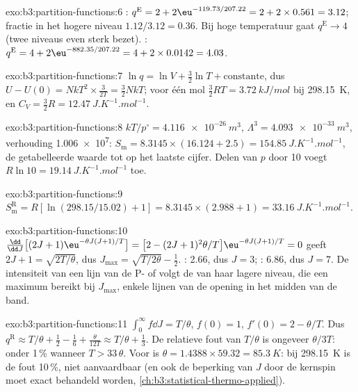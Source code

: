 \begin{solution}{exo:b3:partition-functions:6}
: $q^{\mathrm E} = 2 + 2\eu^{-119.73/207.22} = 2 + 2 \times 0.561 = 3.12$; fractie in het
hogere niveau $1.12/3.12
= 0.36$. Bij hoge temperatuur gaat $q^{\mathrm E} \to 4$ (twee niveaus even
sterk bezet). :
$q^{\mathrm E} = 4 + 2\eu^{-882.35/207.22} = 4 + 2 \times 0.0142 = 4.03$.
\end{solution}

\begin{solution}{exo:b3:partition-functions:7}
$\ln q = \ln V + \frac32\ln T + \text{constante}$, dus $U - U(0) = NkT^2 \times \frac{3}{2T} = \frac32NkT$; voor één
mol $\frac32RT = \qty{3.72}{kJ/mol}$ bij \qty{298.15}{K}, en $C_V = \frac32R = \qty{12.47}{J.K^{-1}.mol^{-1}}$.
\end{solution}

\begin{solution}{exo:b3:partition-functions:8}
$kT/p^\circ = \qty{4.116e-26}{m^3}$, $\Lambda^3 = \qty{4.093e-33}{m^3}$, verhouding \num{1.006e7}:
$S_{\mathrm m} = 8.3145 \times (16.124 + 2.5) = \qty{154.85}{J.K^{-1}.mol^{-1}}$, de
getabelleerde waarde tot op het laatste cijfer. Delen van $p$ door 10 voegt
$R\ln10 = \qty{19.14}{J.K^{-1}.mol^{-1}}$ toe.
\end{solution}

\begin{solution}{exo:b3:partition-functions:9}
$S^{\mathrm R}_{\mathrm m} = R[\ln(298.15/15.02) + 1] = 8.3145 \times (2.988 + 1) = \qty{33.16}{J.K^{-1}.mol^{-1}}$.
\end{solution}

\begin{solution}{exo:b3:partition-functions:10}
$\frac{\dd}{\dd J}\bigl[(2J+1)\eu^{-\theta J(J+1)/T}\bigr] = \bigl[2 - (2J+1)^2\theta/T\bigr]\eu^{-\theta J(J+1)/T} = 0$ geeft
$2J + 1 = \sqrt{2T/\theta}$, dus $J_{\max} = \sqrt{T/2\theta} - \frac12$. : 2.66, dus $J = 3$; :
6.86, dus $J = 7$. De intensiteit van een lijn van de P- of  volgt de
 van haar lagere niveau, die een maximum bereikt bij $J_{\max}$,
enkele lijnen van de opening in het midden van de band.
\end{solution}

\begin{solution}{exo:b3:partition-functions:11}
$\int_0^\infty f\dd J = T/\theta$, $f(0) = 1$, $f'(0) = 2 - \theta/T$. Dus $q^{\mathrm R} \approx T/\theta + \frac12 -
\frac16 + \frac{\theta}{12T} \approx T/\theta + \frac13$. De relatieve fout
van $T/\theta$ is ongeveer $\theta/3T$:
onder 1\,\% wanneer $T > 33\,\theta$. Voor  is $\theta = 1.4388 \times 59.32 = \qty{85.3}{K}$: bij
\qty{298.15}{K} is de fout 10\,\%, niet aanvaardbaar (en ook de beperking
van $J$ door de kernspin moet exact behandeld worden,
\cref{ch:b3:statistical-thermo-applied}).
\end{solution}

